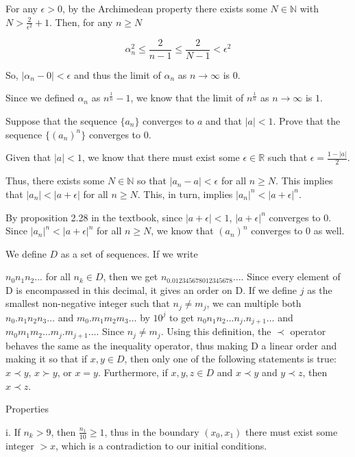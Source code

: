 \documentclass[addpoints]{exam}
\begin{document}
\begin{questions}
For any $\epsilon > 0$, by the Archimedean property there exists some $N \in \mathbb{N}$ with
$N > \frac{2}{\epsilon^2} + 1$. Then, for any $n \geq N$

\[\alpha_n^2 \leq \frac{2}{n - 1} \leq \frac{2}{N - 1} < \epsilon^2\]

So, $|\alpha_n - 0| < \epsilon$ and thus the limit of $\alpha_n$ as $n \to \infty$ is $0$.

Since we defined $\alpha_n$ as $n^{\frac{1}{n}} - 1$, we know that the limit of
$n^{\frac{1}{n}}$ as $n \to \infty$ is $1$.

\question Suppose that the sequence $\{a_n\}$ converges to $a$ and that $|a| < 1$. 
Prove that the sequence $\{(a_n)^n\}$ converges to 0. 

Given that $|a| < 1$, we know that there must exist some $\epsilon \in \mathbb{R}$ such that
$\epsilon = \frac{1 - |a|}{2}$. 

Thus, there exists some $N \in \mathbb{N}$ so that $|a_n - a| < \epsilon$ for all $n \geq N$. This
implies that $|a_n| < |a + \epsilon|$ for all $n \geq N$. This, in turn, implies 
$|a_n|^n < |a + \epsilon|^n$.

By proposition 2.28 in the textbook, since $|a + \epsilon| < 1$, $|a + \epsilon|^n$ converges to 0. Since
$|a_n|^n < |a + \epsilon|^n$ for all $n \geq N$, we know that $(a_n)^n$ converges to 0 as well. 

\question

We define $D$ as a set of sequences. If we write 

$n_0n_1n_2...$ for all $n_k \in D$, then we get $n_0.012345678012345678\dots$. Since 
every element of D is encompassed in this decimal, it gives an order on D. If we define $j$ as 
the smallest non-negative integer such that $n_j \neq m_j$, we can multiple both $n_0.n_1n_2n_3\dots$ and
$m_0.m_1m_2m_3\dots$ by $10^j$ to get $n_0n_1n_2\dots n_j.n_{j+1}\dots$ and $m_0m_1m_2\dots m_j.m_{j+1}\dots$.
Since $n_j \neq m_j$. Using this definition, the $\prec$ operator behaves the same as the inequality 
operator, thus making D a linear order and making it so that if $x, y \in D$, then only one of the 
following statements is true: $x \prec y$, $x \succ y$, or $x = y$. Furthermore, if $x, y, z \in D$ and 
$x \prec y$ and $y \prec z$, then $x \prec z$.

\question Properties


i. If $n_k > 9$, then $\frac{n_1}{10} \geq 1$, thus in the boundary $(x_0, x_1)$ there must exist some
integer $> x$, which is a contradiction to our initial conditions.  


\end{questions}
\end{document}
